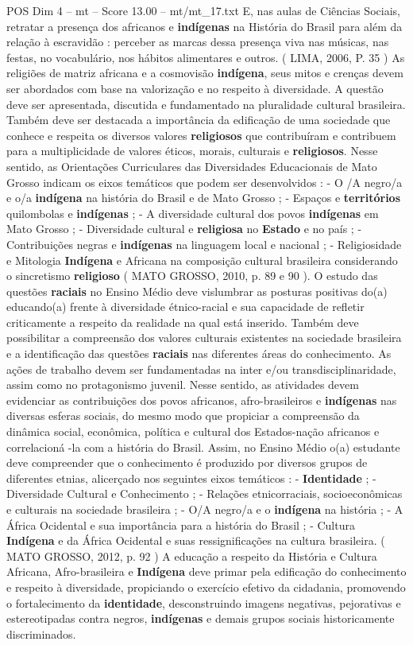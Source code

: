 \begin{textsample}{POS Dim 4 – mt – Score 13.00 – mt/mt\_17.txt}
E, nas aulas de Ciências Sociais, retratar a presença dos africanos e \textbf{indígenas} na História do Brasil para além da relação à escravidão : perceber as marcas dessa presença viva nas músicas, nas festas, no vocabulário, nos hábitos alimentares e outros. ( LIMA, 2006, P. 35 ) As religiões de matriz africana e a cosmovisão \textbf{indígena}, seus mitos e crenças devem ser abordados com base na valorização e no respeito à diversidade.
A questão deve ser apresentada, discutida e fundamentado na pluralidade cultural brasileira.
Também deve ser destacada a importância da edificação de uma sociedade que conhece e respeita os diversos valores \textbf{religiosos} que contribuíram e contribuem para a multiplicidade de valores éticos, morais, culturais e \textbf{religiosos}.
Nesse sentido, as Orientações Curriculares das Diversidades Educacionais de Mato Grosso indicam os eixos temáticos que podem ser desenvolvidos : - O /A negro/a e o/a \textbf{indígena} na história do Brasil e de Mato Grosso ; - Espaços e \textbf{territórios} quilombolas e \textbf{indígenas} ; - A diversidade cultural dos povos \textbf{indígenas} em Mato Grosso ; - Diversidade cultural e \textbf{religiosa} no \textbf{Estado} e no país ; - Contribuições negras e \textbf{indígenas} na linguagem local e nacional ; - Religiosidade e Mitologia \textbf{Indígena} e Africana na composição cultural brasileira considerando o sincretismo \textbf{religioso} ( MATO GROSSO, 2010, p. 89 e 90 ).
O estudo das questões \textbf{raciais} no Ensino Médio deve vislumbrar as posturas positivas do(a) educando(a) frente à diversidade étnico-racial e sua capacidade de refletir criticamente a respeito da realidade na qual está inserido.
Também deve possibilitar a compreensão dos valores culturais existentes na sociedade brasileira e a identificação das questões \textbf{raciais} nas diferentes áreas do conhecimento.
As ações de trabalho devem ser fundamentadas na inter e/ou transdisciplinaridade, assim como no protagonismo juvenil.
Nesse sentido, as atividades devem evidenciar as contribuições dos povos africanos, afro-brasileiros e \textbf{indígenas} nas diversas esferas sociais, do mesmo modo que propiciar a compreensão da dinâmica social, econômica, política e cultural dos Estados-nação africanos e correlacioná -la com a história do Brasil.
Assim, no Ensino Médio o(a) estudante deve compreender que o conhecimento é produzido por diversos grupos de diferentes etnias, alicerçado nos seguintes eixos temáticos : - \textbf{Identidade} ; - Diversidade Cultural e Conhecimento ; - Relações etnicorraciais, socioeconômicas e culturais na sociedade brasileira ; - O/A negro/a e o \textbf{indígena} na história ; - A África Ocidental e sua importância para a história do Brasil ; - Cultura \textbf{Indígena} e da África Ocidental e suas ressignificações na cultura brasileira. ( MATO GROSSO, 2012, p. 92 ) A educação a respeito da História e Cultura Africana, Afro-brasileira e \textbf{Indígena} deve primar pela edificação do conhecimento e respeito à diversidade, propiciando o exercício efetivo da cidadania, promovendo o fortalecimento da \textbf{identidade}, desconstruindo imagens negativas, pejorativas e estereotipadas contra negros, \textbf{indígenas} e demais grupos sociais historicamente discriminados.

\end{textsample}
